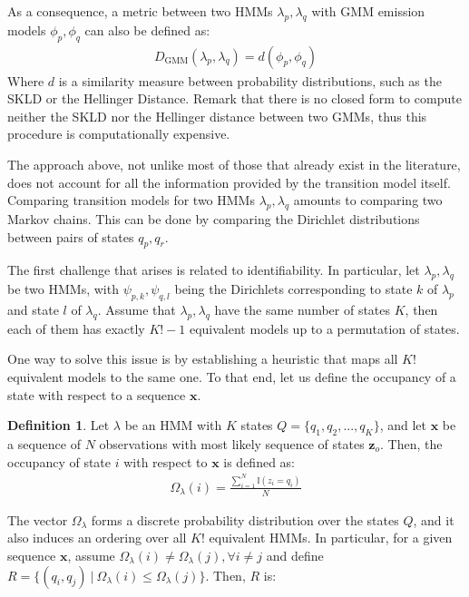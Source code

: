 \documentclass[pdftex,11pt,a4paper]{article}
\theoremstyle{definition}
\newtheorem{definition}{Definition}[section]
\theoremstyle{remark}
\newcommand*{\V}[1]{\mathbf{#1}}%
\newcommand\given[1][]{\:#1\vert\:}
\begin{document}
\par As a consequence, a metric between two HMMs $\lambda_p, \lambda_q$ with GMM emission models $\phi_p, \phi_q$ can also be defined as:
\begin{align*}
D_{\text{GMM}}(\lambda_p, \lambda_q) = d( \phi_p, \phi_q )
\end{align*}
Where $d$ is a similarity measure between probability distributions, such as the SKLD or the Hellinger Distance. Remark that there is no closed form to compute neither the SKLD nor the Hellinger distance between two GMMs, thus this procedure is computationally expensive.
\par The approach above, not unlike most of those that already exist in the literature, does not account for all the information provided by the transition model itself. Comparing transition models for two HMMs $\lambda_p, \lambda_q$ amounts to comparing two Markov chains. This can be done by comparing the Dirichlet distributions between pairs of states $q_p, q_r$. 
\par The first challenge that arises is related to identifiability. In particular, let $\lambda_p, \lambda_q$ be two HMMs, with $\psi_{p, k}, \psi_{q, l}$ being the Dirichlets corresponding to state $k$ of $\lambda_p$ and state $l$ of $\lambda_q$. Assume that $\lambda_p, \lambda_q$ have the same number of states $K$, then each of them has exactly $K!-1$ equivalent models up to a permutation of states. 
\par One way to solve this issue is by establishing a heuristic that maps all $K!$ equivalent models to the same one. To that end, let us define the occupancy of a state with respect to a sequence $\V{x}$. 
\begin{definition}\label{def_occupancy}
Let $\lambda$ be an HMM with $K$ states $Q = \{q_1, q_2, ..., q_K\}$, and let $\V{x}$ be a sequence of $N$ observations with most likely sequence of states $\V{z}_o$. Then, the occupancy of state $i$ with respect to $\V{x}$ is defined as:
\begin{align*}
\Omega_\lambda(i) = \frac{\sum_{i=1}^N\mathbb{I}(z_{i} = q_i)}{N}
\end{align*}
\end{definition}
\par The vector $\Omega_\lambda$ forms a discrete probability distribution over the states $Q$, and it also induces an ordering over all $K!$ equivalent HMMs. In particular, for a given sequence $\V{x}$, assume $\Omega_\lambda(i) \neq \Omega_\lambda(j), \forall i\neq j$ and define $R = \{(q_i, q_j) \given \Omega_\lambda(i) \leq \Omega_\lambda(j)\}$. Then, $R$ is:
\end{document}
